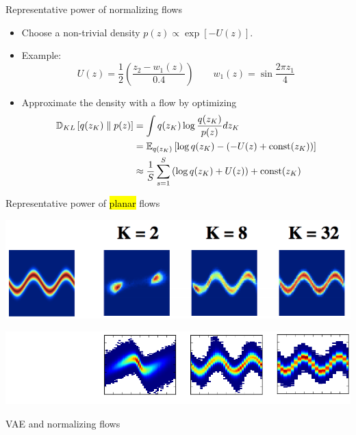 \documentclass[unicode,11pt]{beamer}
\begin{document}
\begin{frame}{Representative power of normalizing flows}
  \begin{itemize}
  \item Choose a non-trivial density $p(z) \propto \exp[-U(z)]$.
  \item Example:
    $$
    U(z) = \frac{1}{2} \left( \frac{z_2 - w_1(z)}{0.4} \right)
    \qquad
    w_1(z) = \sin \frac{2 \pi z_1}{4}
    $$
  \item Approximate the density with a flow by optimizing
    \begin{align*}
      \KL{q(z_K)}{p(z)}
      &= \int q(z_K) \log \frac{q(z_K)}{p(z)} dz_K \\
      &= \E{q(z_K)}{\log q(z_K) - (-U(z) + \op{const}(z_K))} \\
      &\approx \frac{1}{S} \sum\limits_{s = 1}^S \left( \log q(z_K) + U(z) \right) + \op{const}(z_K)
    \end{align*}
  \end{itemize}
\end{frame}


\begin{frame}[fragile]{Representative power of \hl{planar} flows}
  \begin{center}
    \includegraphics[width=.8\textwidth]{images/normalizing_flow}
  \end{center}

  \begin{center}
    \includegraphics[width=.8\textwidth]{images/normalizing_flow1}
  \end{center}
\end{frame}


\begin{frame}{VAE and normalizing flows}
  \centering
\end{frame}
\end{document}
